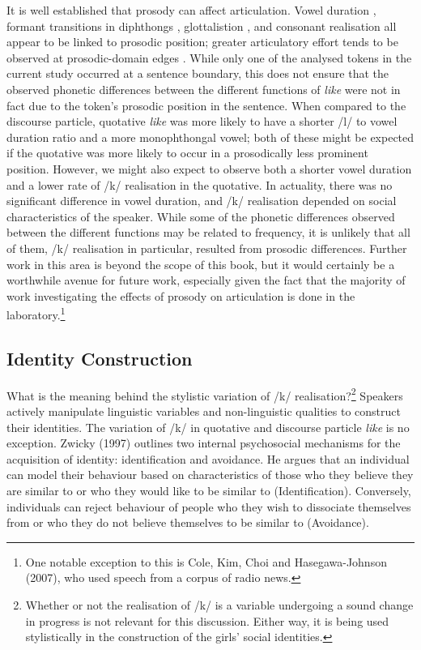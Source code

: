 It is well established that prosody can affect articulation.  Vowel duration \cite{edwardsbeckman1992}, formant transitions in diphthongs \cite{woutersmacon2002}, glottalistion \cite{dilleyetal1996}, and consonant realisation \cite{fougeronkeating1997} all appear to be linked to prosodic position; greater articulatory effort tends to be observed at prosodic-domain edges \cite{fougeronkeating1997}.  While only one of the analysed tokens in the current study occurred at a sentence boundary, this does not ensure that the observed phonetic differences between the different functions of \textit{like} were not in fact due to the token's prosodic position in the sentence.  When compared to the discourse particle, quotative \textit{like} was more likely to have a shorter /l/ to vowel duration ratio and a more monophthongal vowel; both of these might be expected if the quotative was more likely to occur in a prosodically less prominent position.  However, we might also expect to observe both a shorter vowel duration and a lower rate of /k/ realisation in the quotative.  In actuality, there was no significant difference in vowel duration, and /k/ realisation depended on social characteristics of the speaker.  While some of the phonetic differences observed between the different functions may be related to frequency, it is unlikely that all of them, /k/ realisation in particular, resulted from prosodic differences.  Further work in this area is beyond the scope of this book, but it would certainly be a worthwhile avenue for future work, especially given the fact that the majority of work investigating the effects of prosody on articulation is done in the laboratory.\footnote{One notable exception to this is Cole, Kim, Choi and Hasegawa-Johnson (2007), who used speech from a corpus of radio news.\nocite{coleetal2007}}  

\subsection{Identity Construction}\label{sec:idconstruction}

 

What is the meaning behind the stylistic variation of /k/ realisation?\footnote{Whether or not the realisation of /k/ is a variable undergoing a sound change in progress is not relevant for this discussion.  Either way, it is being used stylistically in the construction of the girls' social identities.}  Speakers actively manipulate linguistic variables and non-linguistic qualities to construct their identities.  The variation of /k/ in quotative and discourse particle \textit{like} is no exception.  Zwicky (1997) outlines two internal psychosocial mechanisms for the acquisition of identity: identification and avoidance.  He argues that an individual can model their behaviour based on characteristics of those who they believe they are similar to or who they would like to be similar to (Identification).  Conversely, individuals can reject behaviour of people who they wish to dissociate themselves from or who they do not believe themselves to be similar to (Avoidance).

